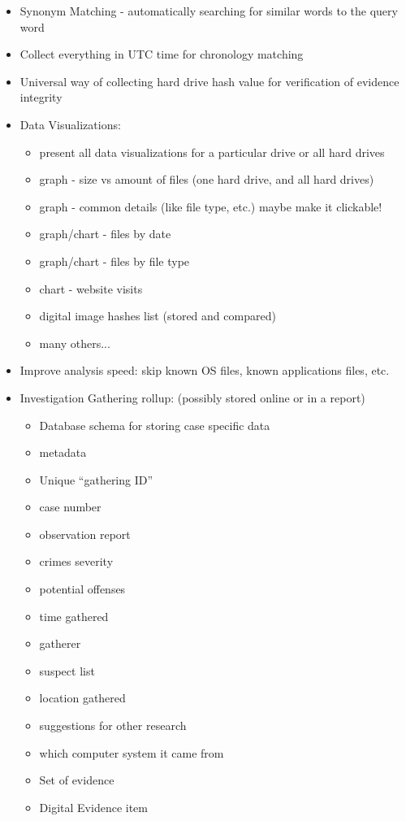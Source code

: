 \documentclass[12pt]{article}
\begin{document}
{\begin{itemize}
  \item Synonym Matching - automatically searching for similar words to the query word
  \item Collect everything in UTC time for chronology matching
  \item Universal way of collecting hard drive hash value for verification of evidence integrity
  \item Data Visualizations:
  \begin{itemize}
    \item present all data visualizations for a particular drive or all hard drives
    \item graph - size vs amount of files (one hard drive, and all hard drives)
    \item graph - common details (like file type, etc.) maybe make it clickable!
    \item graph/chart - files by date
    \item graph/chart - files by file type
    \item chart - website visits
    \item digital image hashes list (stored and compared)
    \item many others...
  \end{itemize}
  \item Improve analysis speed: skip known OS files, known applications files, etc.
  \item Investigation Gathering rollup: (possibly stored online or in a report)
  \begin{itemize}
    \item Database schema for storing case specific data
    \item metadata
    \item Unique ``gathering ID''
    \item case number
    \item observation report
    \item crimes severity
    \item potential offenses
    \item time gathered
    \item gatherer
    \item suspect list
    \item location gathered
    \item suggestions for other research
    \item which computer system it came from
    \item Set of evidence
    \item Digital Evidence item

\end{itemize}
\end{itemize}}
\end{document}
